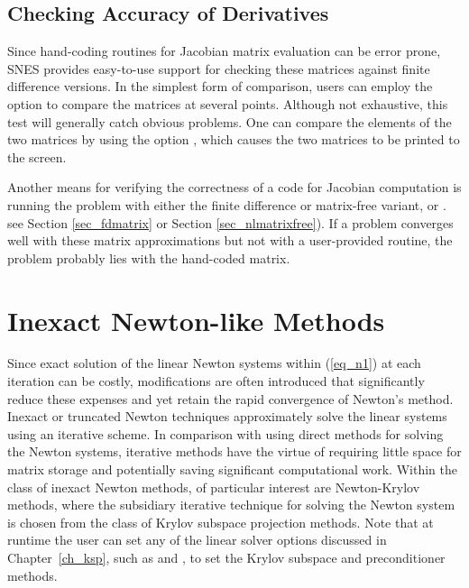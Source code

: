\subsection{Checking Accuracy of Derivatives}
\label{sec_snesderivs}

Since hand-coding routines for Jacobian matrix evaluation
can be error prone, SNES provides easy-to-use support for checking
these matrices against finite difference versions.  In the simplest
form of comparison, users can employ the option  
to compare the matrices at several points.  Although not exhaustive,
this test will generally catch obvious problems.  One can compare the
elements of the two matrices by using the option  , which causes the two 
matrices to be printed to the screen.  

Another means for verifying the correctness of a code for Jacobian
computation is running the problem with either the finite
difference or matrix-free variant,  or .
see Section \ref{sec_fdmatrix} or Section \ref{sec_nlmatrixfree}). 
If a problem converges well
with these matrix approximations but not with a user-provided routine,
the problem probably lies with the hand-coded
matrix. 

\section{Inexact Newton-like Methods}

Since exact solution of the linear Newton systems within (\ref{eq_n1}) 
at each iteration can be costly, modifications 
are often introduced that significantly reduce these expenses and 
yet retain the rapid convergence of Newton's method.  Inexact or 
truncated Newton techniques approximately solve the linear systems 
using an iterative scheme.  In comparison with using direct methods 
for solving the Newton systems, iterative methods have the virtue 
of requiring little space for matrix storage and potentially saving 
significant computational work.  Within the class of inexact Newton 
methods, of particular interest are Newton-Krylov methods, where the 
subsidiary iterative technique for solving the Newton system is 
chosen from the class of Krylov subspace projection methods. 
Note that at runtime the user can set any of the linear solver
options discussed in Chapter~\ref{ch_ksp}, such as 
 and ,
to set the Krylov subspace and preconditioner methods.

